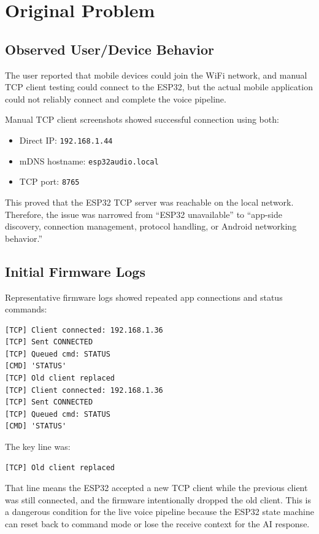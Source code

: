 \documentclass[11pt,a4paper]{article}
\begin{document}
\section{Original Problem}

\subsection{Observed User/Device Behavior}

The user reported that mobile devices could join the WiFi network, and manual TCP client testing could connect to the ESP32, but the actual mobile application could not reliably connect and complete the voice pipeline.

Manual TCP client screenshots showed successful connection using both:

\begin{itemize}[leftmargin=*]
  \item Direct IP: \texttt{192.168.1.44}
  \item mDNS hostname: \texttt{esp32audio.local}
  \item TCP port: \texttt{8765}
\end{itemize}

This proved that the ESP32 TCP server was reachable on the local network. Therefore, the issue was narrowed from ``ESP32 unavailable'' to ``app-side discovery, connection management, protocol handling, or Android networking behavior.''

\subsection{Initial Firmware Logs}

Representative firmware logs showed repeated app connections and status commands:

\begin{lstlisting}[style=logstyle]
[TCP] Client connected: 192.168.1.36
[TCP] Sent CONNECTED
[TCP] Queued cmd: STATUS
[CMD] 'STATUS'
[TCP] Old client replaced
[TCP] Client connected: 192.168.1.36
[TCP] Sent CONNECTED
[TCP] Queued cmd: STATUS
[CMD] 'STATUS'
\end{lstlisting}

The key line was:

\begin{lstlisting}[style=logstyle]
[TCP] Old client replaced
\end{lstlisting}

That line means the ESP32 accepted a new TCP client while the previous client was still connected, and the firmware intentionally dropped the old client. This is a dangerous condition for the live voice pipeline because the ESP32 state machine can reset back to command mode or lose the receive context for the AI response.
\end{document}
